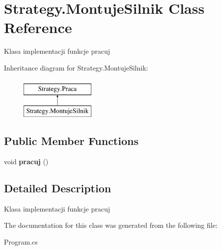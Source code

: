 \hypertarget{class_strategy_1_1_montuje_silnik}{}\section{Strategy.\+Montuje\+Silnik Class Reference}
\label{class_strategy_1_1_montuje_silnik}


Klasa implementacji funkcje pracuj  


Inheritance diagram for Strategy.\+Montuje\+Silnik\+:\begin{figure}[H]
\begin{center}
\leavevmode
\includegraphics[height=2.000000cm]{class_strategy_1_1_montuje_silnik}
\end{center}
\end{figure}
\subsection*{Public Member Functions}
\begin{DoxyCompactItemize}
\item 
\mbox{\label{class_strategy_1_1_montuje_silnik_acf351bbbf344fa57a1d81c9977aa8582}} 
void {\bfseries pracuj} ()
\end{DoxyCompactItemize}


\subsection{Detailed Description}
Klasa implementacji funkcje pracuj 



The documentation for this class was generated from the following file\+:\begin{DoxyCompactItemize}
\item 
Program.\+cs\end{DoxyCompactItemize}
